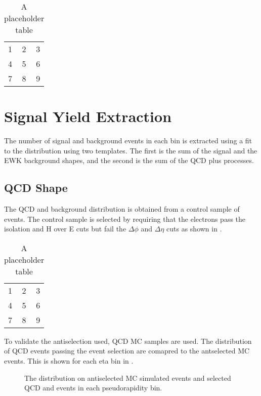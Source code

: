 \begin{table}[htb]
  \centering
  \begin{tabular}{| l c r |}
    \hline
    1 & 2 & 3 \\
    4 & 5 & 6 \\
    7 & 8 & 9 \\
  \hline
  \end{tabular}
  \caption{A placeholder table}
  \label{asym36:selectedcomp}
\end{table}


\section{Signal Yield Extraction}

The number of signal and background events in each bin is extracted using a fit
to the \ETm distribution using two templates.
The first is the sum of the \Wenu signal and the \ac{EWK} background shapes,
and the second is the sum of the \ac{QCD} plus \gjet processes.

\subsection{\ac{QCD} \ETm Shape}

The \ac{QCD} and \gjet background distribution is obtained from a control sample of
events. The control sample is selected by requiring that the electrons pass the
isolation and H over E cuts but fail the $\Delta\phi$ and $\Delta\eta$ cuts as
shown in .

\begin{table}[htb]
  \centering
  \begin{tabular}{| l c r |}
    \hline
    1 & 2 & 3 \\
    4 & 5 & 6 \\
    7 & 8 & 9 \\
  \hline
  \end{tabular}
  \caption{A placeholder table}
  \label{asym36:antisel}
\end{table}

To validate the antiselection used, \ac{QCD} \ac{MC} samples are used. The
distribution of \ac{QCD} events passing the event selection are comapred to the
antselected MC events. This is shown for each eta bin in
.

\begin{figure}[htb]
  \centering
  \caption{The \ETm distribution on antiselected \ac{MC} simulated events
  and selected \ac{QCD} and \gjet events in each pseudorapidity bin.}
  \label{asym36:antiselclosure}
\end{figure}

